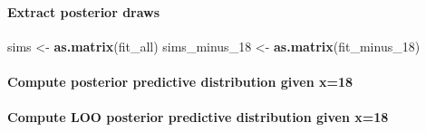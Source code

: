 \documentclass[
]{article}
\newenvironment{Shaded}{\begin{snugshade}}{\end{snugshade}}
\newcommand{\ControlFlowTok}[1]{\textcolor[rgb]{0.13,0.29,0.53}{\textbf{#1}}}
\newcommand{\DataTypeTok}[1]{\textcolor[rgb]{0.13,0.29,0.53}{#1}}
\newcommand{\DecValTok}[1]{\textcolor[rgb]{0.00,0.00,0.81}{#1}}
\newcommand{\KeywordTok}[1]{\textcolor[rgb]{0.13,0.29,0.53}{\textbf{#1}}}
\newcommand{\NormalTok}[1]{#1}
\newcommand{\OperatorTok}[1]{\textcolor[rgb]{0.81,0.36,0.00}{\textbf{#1}}}
\newcommand{\StringTok}[1]{\textcolor[rgb]{0.31,0.60,0.02}{#1}}
\begin{document}
\hypertarget{extract-posterior-draws}{%
\paragraph{Extract posterior draws}\label{extract-posterior-draws}}

\begin{Shaded}
\begin{Highlighting}[]
\NormalTok{sims <-}\StringTok{ }\KeywordTok{as.matrix}\NormalTok{(fit_all)}
\NormalTok{sims_minus_}\DecValTok{18}\NormalTok{ <-}\StringTok{ }\KeywordTok{as.matrix}\NormalTok{(fit_minus_}\DecValTok{18}\NormalTok{)}
\end{Highlighting}
\end{Shaded}

\hypertarget{compute-posterior-predictive-distribution-given-x18}{%
\paragraph{Compute posterior predictive distribution given
x=18}\label{compute-posterior-predictive-distribution-given-x18}}

\begin{Shaded}
\end{Shaded}

\hypertarget{compute-loo-posterior-predictive-distribution-given-x18}{%
\paragraph{Compute LOO posterior predictive distribution given
x=18}\label{compute-loo-posterior-predictive-distribution-given-x18}}
\end{document}

